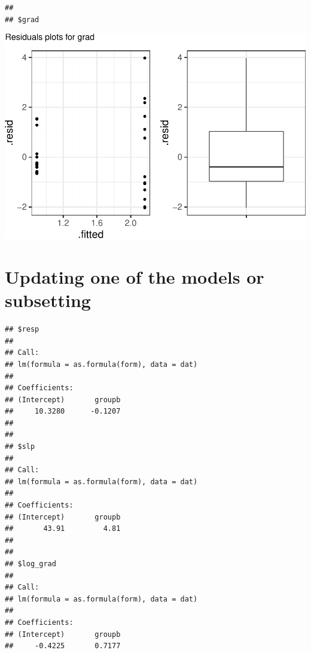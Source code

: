 \documentclass[]{article}
\newenvironment{Shaded}{\begin{snugshade}}{\end{snugshade}}
\newcommand{\KeywordTok}[1]{\textcolor[rgb]{0.13,0.29,0.53}{\textbf{#1}}}
\newcommand{\StringTok}[1]{\textcolor[rgb]{0.31,0.60,0.02}{#1}}
\newcommand{\OtherTok}[1]{\textcolor[rgb]{0.56,0.35,0.01}{#1}}
\newcommand{\OperatorTok}[1]{\textcolor[rgb]{0.81,0.36,0.00}{\textbf{#1}}}
\newcommand{\NormalTok}[1]{#1}
\begin{document}
\begin{verbatim}
## 
## $grad
\end{verbatim}

\begin{center}\includegraphics{purr_map_demo_files/figure-latex/unnamed-chunk-6-3} \end{center}

\section{Updating one of the models or
subsetting}\label{updating-one-of-the-models-or-subsetting}

\begin{Shaded}
\end{Shaded}

\begin{verbatim}
## $resp
## 
## Call:
## lm(formula = as.formula(form), data = dat)
## 
## Coefficients:
## (Intercept)       groupb  
##     10.3280      -0.1207  
## 
## 
## $slp
## 
## Call:
## lm(formula = as.formula(form), data = dat)
## 
## Coefficients:
## (Intercept)       groupb  
##       43.91         4.81  
## 
## 
## $log_grad
## 
## Call:
## lm(formula = as.formula(form), data = dat)
## 
## Coefficients:
## (Intercept)       groupb  
##     -0.4225       0.7177
\end{verbatim}
\end{document}
